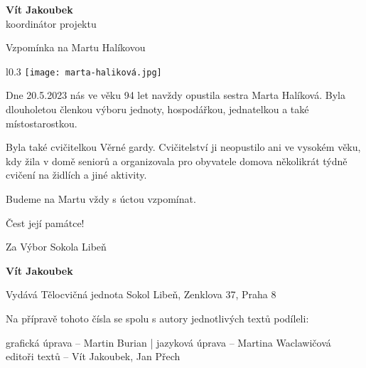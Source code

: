 \documentclass[11pt]{article}
\newcommand{\post}[1]{%
\begin{center}
{\huge \tyrs #1}
\end{center}
}
\newcommand{\signature}[2]{%
  \begin{flushright}
    \textbf{#1}\\#2
  \end{flushright}
}
\begin{document}
\signature{Vít Jakoubek}{koordinátor projektu}

\clearpage

\post{Vzpomínka na Martu Halíkovou}

\noindent
\begin{wrapfigure}{l}{0.3\textwidth}
  \texttt{[image: marta-haliková.jpg]} 
\end{wrapfigure}

\noindent Dne 20.5.2023 nás ve věku 94 let navždy opustila  sestra Marta Halíková. Byla dlouholetou členkou výboru jednoty, hospodářkou, jednatelkou a také místostarostkou. 

Byla  také cvičitelkou  Věrné gardy. Cvičitelství ji neopustilo ani ve vysokém věku, kdy žila v domě seniorů a organizovala pro obyvatele domova několikrát týdně  cvičení na židlích a jiné aktivity. 

Budeme na Martu vždy s úctou vzpomínat. 

\vspace*{6pt}
Čest její památce!
\vspace*{6pt}

Za Výbor Sokola Libeň

\signature{Vít Jakoubek}

\clearpage

\pagestyle{blank}

\vspace*{96pt}

\pagecolor{sokolred}
\color{white}


\vspace*{\fill}

\begin{center}
Vydává Tělocvičná jednota Sokol Libeň, Zenklova 37, Praha 8

\vspace*{12pt}

Na přípravě tohoto čísla se spolu s autory jednotlivých textů podíleli:

grafická úprava – Martin Burian | jazyková úprava – Martina Waclawičová \\ editoři textů – Vít Jakoubek, Jan Přech
\end{center}
\end{document}
